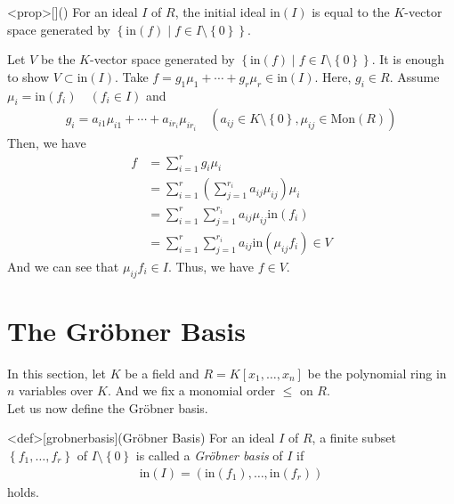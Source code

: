 \documentclass{article}
\renewcommand{\mid}{\middle|}
\begin{document}
\begin{statementsp}<prop>[]()
    For an ideal $I$ of $R$, the initial ideal $\mathrm{in}(I)$ is equal to the $K$-vector space generated by $\left\{ \mathrm{in}(f) \mid f \in I \setminus \left\{ 0 \right\} \right\}$.
\end{statementsp}
\begin{pfsp}
    Let $V$ be the $K$-vector space generated by $\left\{ \mathrm{in}(f) \mid f \in I \setminus \left\{ 0 \right\} \right\}$. It is enough to show $V \subset \mathrm{in}(I)$. Take $f = g_1 \mu_1 + \cdots + g_r \mu_r \in \mathrm{in}(I)$. Here, $g_i \in R$. Assume $\mu_i = \mathrm{in}(f_i) \quad (f_i \in I)$ and 
    \begin{align}
        g_i = a_{i1} \mu_{i1} + \cdots + a_{ir_i} \mu_{ir_i} \quad (a_{ij} \in K \setminus \left\{ 0 \right\}, \mu_{ij} \in \mathrm{Mon}(R))
    \end{align}
    Then, we have
    \begin{align}
        f &= \sum_{i=1}^{r} g_i \mu_i \\ 
        &= \sum_{i=1}^{r} \left( \sum_{j=1}^{r_i} a_{ij} \mu_{ij} \right) \mu_i \\
        &= \sum_{i=1}^{r} \sum_{j=1}^{r_i} a_{ij} \mu_{ij} \mathrm{in}(f_i) \\ 
        &= \sum_{i=1}^{r} \sum_{j=1}^{r_i} a_{ij} \mathrm{in}(\mu_{ij} f_i) \in V
    \end{align}
    And we can see that $\mu_{ij} f_i \in I$. Thus, we have $f \in V$.
\end{pfsp}

\newpage 

\section{The Gr\"{o}bner Basis}
In this section, let $K$ be a field and $R = K[x_1, \ldots, x_n]$ be the polynomial ring in $n$ variables over $K$. And we fix a monomial order $\leq$ on $R$. \\ 
Let us now define the Gr\"{o}bner basis.

\begin{statementsp}<def>[grobnerbasis](Gr\"{o}bner Basis)
    For an ideal $I$ of $R$, a finite subset $\left\{ f_1, \ldots, f_r \right\}$ of $I \setminus \left\{ 0 \right\}$ is called a \textit{Gr\"{o}bner basis} of $I$ if 
    \begin{align}
        \mathrm{in}(I) = \left( \mathrm{in}(f_1), \ldots, \mathrm{in}(f_r) \right)
    \end{align}
    holds.
\end{statementsp}
\end{document}
